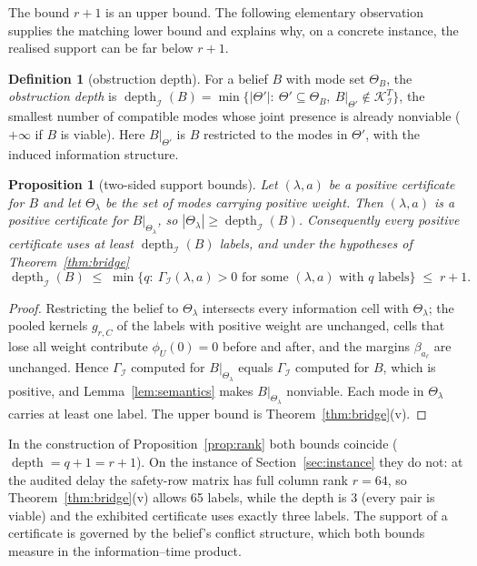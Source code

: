\documentclass[11pt,a4paper]{article}
\theoremstyle{plain}
\newtheorem{proposition}[theorem]{Proposition}
\theoremstyle{definition}
\newtheorem{definition}[theorem]{Definition}
\theoremstyle{remark}
\newcommand{\calI}{\mathcal{I}}
\newcommand{\calK}{\mathcal{K}}
\newcommand{\Gam}{\Gamma_{\calI}}
\DeclareMathOperator{\depth}{depth}
\begin{document}
The bound $r+1$ is an upper bound. The following elementary observation supplies the matching lower bound and explains why, on a concrete instance, the realised support can be far below $r+1$.

\begin{definition}[obstruction depth]\label{def:depth}
For a belief $B$ with mode set $\Theta_B$, the \emph{obstruction depth} is
$\depth_\calI(B)=\min\{|\Theta'|:\ \Theta'\subseteq\Theta_B,\ B|_{\Theta'}\notin\calK^T_\calI\}$, the smallest number of compatible modes whose joint presence is already nonviable ($+\infty$ if $B$ is viable). Here $B|_{\Theta'}$ is $B$ restricted to the modes in $\Theta'$, with the induced information structure.
\end{definition}

\begin{proposition}[two-sided support bounds]\label{prop:depth}
Let $(\lambda,a)$ be a positive certificate for $B$ and let $\Theta_\lambda$ be the set of modes carrying positive weight. Then $(\lambda,a)$ is a positive certificate for $B|_{\Theta_\lambda}$, so $|\Theta_\lambda|\ge\depth_\calI(B)$. Consequently every positive certificate uses at least $\depth_\calI(B)$ labels, and under the hypotheses of Theorem~\ref{thm:bridge}
\[
\depth_\calI(B)\;\le\;\min\{q:\ \Gam(\lambda,a)>0\text{ for some }(\lambda,a)\text{ with }q\text{ labels}\}\;\le\;r+1 .
\]
\end{proposition}

\begin{proof}
Restricting the belief to $\Theta_\lambda$ intersects every information cell with $\Theta_\lambda$; the pooled kernels $g_{r,C}$ of the labels with positive weight are unchanged, cells that lose all weight contribute $\phi_U(0)=0$ before and after, and the margins $\beta_{a_\ell}$ are unchanged. Hence $\Gam$ computed for $B|_{\Theta_\lambda}$ equals $\Gam$ computed for $B$, which is positive, and Lemma~\ref{lem:semantics} makes $B|_{\Theta_\lambda}$ nonviable. Each mode in $\Theta_\lambda$ carries at least one label. The upper bound is Theorem~\ref{thm:bridge}(v).
\end{proof}

In the construction of Proposition~\ref{prop:rank} both bounds coincide ($\depth=q+1=r+1$). On the instance of Section~\ref{sec:instance} they do not: at the audited delay the safety-row matrix has full column rank $r=64$, so Theorem~\ref{thm:bridge}(v) allows 65 labels, while the depth is $3$ (every pair is viable) and the exhibited certificate uses exactly three labels. The support of a certificate is governed by the belief's conflict structure, which both bounds measure in the information--time product.
\end{document}
